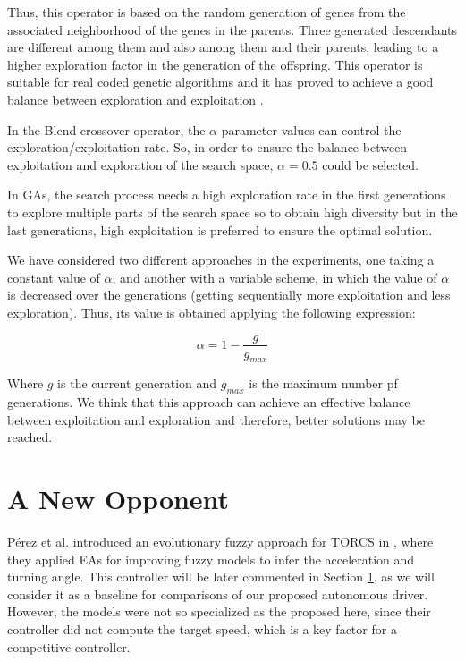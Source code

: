 \documentclass[conference]{IEEEtran}
\begin{document}
Thus, this operator is based on the random generation of genes from the associated neighborhood of the genes in the parents. Three generated descendants are different among them and also among them and their parents, leading to a higher exploration factor in the generation of the offspring.
This operator is suitable for real coded genetic algorithms and it has proved to achieve a good balance between exploration and exploitation \cite{blx2008}.

In the Blend crossover operator, the $\alpha$ parameter values can control the exploration/exploitation rate. So, in order to ensure the balance between exploitation and exploration of the search space, $\alpha = 0.5$ could be selected.

In GAs, the search process needs a high exploration rate in the first generations to explore multiple parts of the search space so to obtain high diversity but in the last generations, high exploitation is preferred to ensure the optimal solution.

We have considered two different approaches in the experiments, one taking a  constant value of $\alpha$, and another with a variable scheme, in which the value of $\alpha$ is decreased over the generations (getting sequentially more exploitation and less exploration). Thus, its value is obtained applying the following expression:

\begin{equation}
\label{eqalpha}
\alpha =1-\frac{g}{g_{max}}
\end{equation}

Where $g$ is the current generation and $g_{max}$ is the maximum number pf generations. We think that this approach can achieve an effective balance between exploitation and exploration and therefore, better solutions may be reached.




\section{A New Opponent}  
\label{sec:new-opponent}


P{\'e}rez et al. introduced an evolutionary fuzzy approach for TORCS in \cite{PerezEvolvingFuzzy09}, where they applied EAs for improving fuzzy models to infer the acceleration and turning angle. This controller will be later commented in Section \ref{sec:new-opponent}, as we will consider it as a baseline for comparisons of our proposed autonomous driver.
However, the models were not so specialized as the proposed here, since their controller did not compute the target speed, which is a key factor for a competitive controller. 
\end{document}
